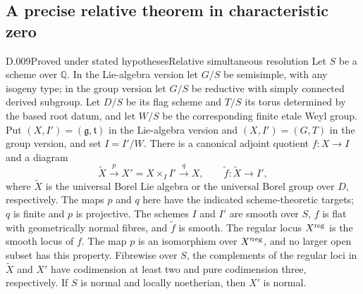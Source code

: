 \subsection{A precise relative theorem in characteristic zero}
\begin{saresult}{D.009}{Proved under stated hypotheses}{Relative simultaneous resolution}
Let $S$ be a scheme over $\mathbb Q$.  In the Lie-algebra version let
$G/S$ be semisimple, with any isogeny type; in the group version let
$G/S$ be reductive with simply connected derived subgroup.  Let $D/S$
be its flag scheme and $T/S$ its torus determined by the based root
datum, and let $W/S$ be the corresponding finite etale Weyl group.
Put $(X,I')=(\mathfrak g,\mathfrak t)$ in the Lie-algebra version and
$(X,I')=(G,T)$ in the group version, and set $I=I'/W$.
There is a canonical adjoint quotient $f:X\to I$ and a diagram
\[
 \widetilde X\xrightarrow{p}X'=X\times_I I'
   \xrightarrow{q}X,
 \qquad \widetilde f:\widetilde X\to I',
\]
where $\widetilde X$ is the universal Borel Lie algebra or the universal
Borel group over $D$, respectively.  The maps $p$ and $q$ here have
the indicated scheme-theoretic targets; $q$ is finite and $p$ is
projective.  The schemes $I$ and $I'$ are smooth over $S$, $f$ is flat
with geometrically normal fibres, and $\widetilde f$ is smooth.
The regular locus $X^{\rm reg}$ is the smooth locus of $f$.
The map $p$ is an isomorphism over $X'^{\rm reg}$, and no larger
open subset has this property.  Fibrewise over $S$, the complements
of the regular loci in $\widetilde X$ and $X'$ have codimension at
least two and pure codimension three, respectively.  If $S$ is normal
and locally noetherian, then $X'$ is normal.
\end{saresult}
